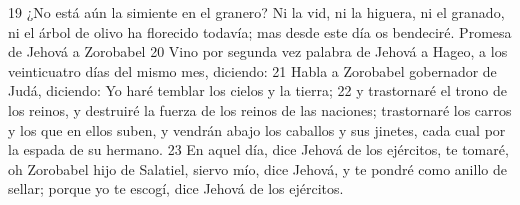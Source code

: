 19 ¿No está aún la simiente en el granero? Ni la vid, ni la higuera, ni el granado, ni el árbol de olivo ha florecido todavía; mas desde este día os bendeciré.
Promesa de Jehová a Zorobabel
20 Vino por segunda vez palabra de Jehová a Hageo, a los veinticuatro días del mismo mes, diciendo:
21 Habla a Zorobabel gobernador de Judá, diciendo: Yo haré temblar los cielos y la tierra;
22 y trastornaré el trono de los reinos, y destruiré la fuerza de los reinos de las naciones; trastornaré los carros y los que en ellos suben, y vendrán abajo los caballos y sus jinetes, cada cual por la espada de su hermano.
23 En aquel día, dice Jehová de los ejércitos, te tomaré, oh Zorobabel hijo de Salatiel, siervo mío, dice Jehová, y te pondré como anillo de sellar; porque yo te escogí, dice Jehová de los ejércitos.


